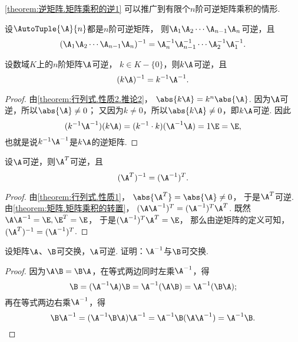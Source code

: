 \cref{theorem:逆矩阵.矩阵乘积的逆1} 可以推广到有限个\(n\)阶可逆矩阵乘积的情形.
\begin{property}\label{theorem:逆矩阵.矩阵乘积的逆2}
设\(\AutoTuple{\A}{n}\)都是\(n\)阶可逆矩阵，
则\(\A_1 \A_2 \dotsm \A_{n-1} \A_n\)可逆，且\begin{equation}
(\A_1 \A_2 \dotsm \A_{n-1} \A_n)^{-1}
= \A_n^{-1} \A_{n-1}^{-1} \dotsm \A_2^{-1} \A_1^{-1}.
\end{equation}
\end{property}

\begin{property}\label{theorem:逆矩阵.数与矩阵乘积的逆}
设数域\(K\)上的\(n\)阶矩阵\(\A\)可逆，
\(k \in K-\{0\}\)，则\(k\A\)可逆，且
\begin{equation}
	(k\A)^{-1}=k^{-1}\A^{-1}.
\end{equation}
\begin{proof}
由\cref{theorem:行列式.性质2.推论2}，
\(\abs{k\A} = k^n\abs{\A}\).
因为\(\A\)可逆，所以\(\abs{\A}\neq0\)；
又因为\(k\neq0\)，所以\(\abs{k\A}\neq0\)，即\(k\A\)可逆.
因此\[
	(k^{-1}\A^{-1})(k\A)
	= (k^{-1} \cdot k)(\A^{-1}\A)
	= 1 \E = \E,
\]
也就是说\(k^{-1}\A^{-1}\)是\(k\A\)的逆矩阵.
\end{proof}
\end{property}

\begin{property}\label{theorem:逆矩阵.转置矩阵的逆与逆矩阵的转置}
设\(\A\)可逆，则\(\A^T\)可逆，且\begin{equation}
	(\A^T)^{-1}=(\A^{-1})^T.
\end{equation}
\begin{proof}
由\cref{theorem:行列式.性质1}，
\(\abs{\A^T}=\abs{\A}\neq0\)，
于是\(\A^T\)可逆.
由\cref{theorem:矩阵.矩阵乘积的转置}，
\((\A \A^{-1})^T = (\A^{-1})^T \A^T\).
既然\(\A \A^{-1} = \E, \E^T = \E\)，
于是\((\A^{-1})^T \A^T = \E\)，
那么由逆矩阵的定义可知，
\((\A^T)^{-1}=(\A^{-1})^T\).
\end{proof}
\end{property}

\begin{example}
设矩阵\(\A\)、\(\B\)可交换，\(\A\)可逆.
证明：\(\A^{-1}\)与\(\B\)可交换.
\begin{proof}
因为\(\A\B = \B\A\)，在等式两边同时左乘\(\A^{-1}\)，得\[
	\B = (\A^{-1}\A)\B = \A^{-1}(\A\B) = \A^{-1}(\B\A);
\]
再在等式两边右乘\(\A^{-1}\)，得\[
	\B\A^{-1} = (\A^{-1}\B\A)\A^{-1} = \A^{-1}\B(\A\A^{-1}) = \A^{-1}\B.
	\qedhere
\]
\end{proof}
\end{example}

